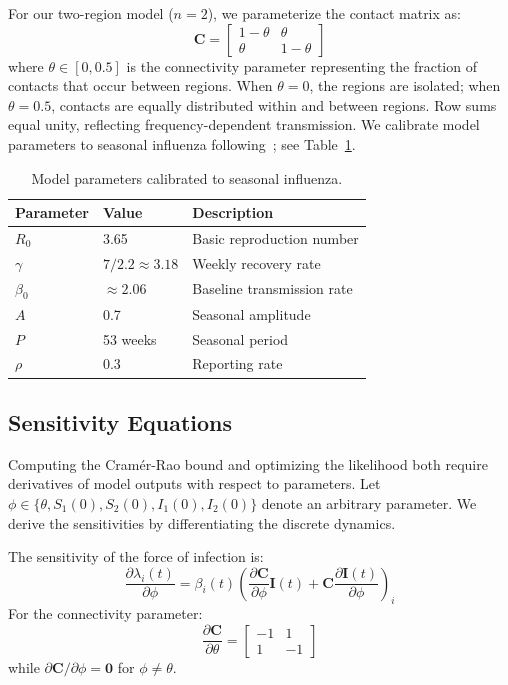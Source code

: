For our two-region model ($n=2$), we parameterize the contact matrix as:
\begin{equation}\label{eq:contact}
\mathbf{C} = \begin{bmatrix} 1-\theta & \theta \\ \theta & 1-\theta \end{bmatrix}
\end{equation}
where $\theta \in [0, 0.5]$ is the connectivity parameter representing
the fraction of contacts that occur between regions. When $\theta = 0$,
the regions are isolated; when $\theta = 0.5$, contacts are equally
distributed within and between regions. Row sums equal unity, reflecting
frequency-dependent transmission. We calibrate model parameters to
seasonal influenza following~\citet{keeling2008}; see
Table~\ref{tab:params}.

\begin{table}[h]
\centering
\begin{tabular}{lll}
\toprule
Parameter & Value & Description \\
\midrule
$R_0$ & 3.65 & Basic reproduction number \\
$\gamma$ & $7/2.2 \approx 3.18$ & Weekly recovery rate \\
$\beta_0$ & $\approx 2.06$ & Baseline transmission rate \\
$A$ & 0.7 & Seasonal amplitude \\
$P$ & 53 weeks & Seasonal period \\
$\rho$ & 0.3 & Reporting rate \\
\bottomrule
\end{tabular}
\caption{Model parameters calibrated to seasonal influenza.}
\label{tab:params}
\end{table}


\subsection*{Sensitivity Equations}

Computing the Cram\'er-Rao bound and optimizing the likelihood both
require derivatives of model outputs with respect to parameters. Let
$\phi \in \{\theta, S_1(0), S_2(0), I_1(0), I_2(0)\}$ denote an
arbitrary parameter. We derive the sensitivities by differentiating
the discrete dynamics.

The sensitivity of the force of infection is:
\begin{equation}\label{eq:sens_lambda}
\frac{\partial \lambda_i(t)}{\partial \phi} = \beta_i(t) \left(
\frac{\partial \mathbf{C}}{\partial \phi} \mathbf{I}(t) + \mathbf{C}
\frac{\partial \mathbf{I}(t)}{\partial \phi} \right)_i
\end{equation}
For the connectivity parameter:
\begin{equation*}
\frac{\partial \mathbf{C}}{\partial \theta} =
\begin{bmatrix} -1 & 1 \\ 1 & -1 \end{bmatrix}
\end{equation*}
while $\partial \mathbf{C}/\partial \phi = \mathbf{0}$ for $\phi \neq
\theta$.


